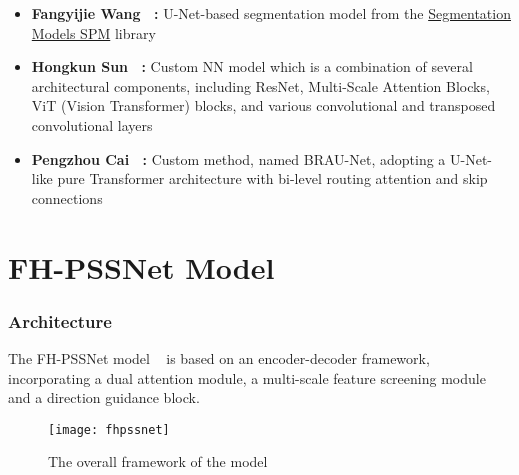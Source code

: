 \begin{frame}
\begin{itemize}
            \item \textbf{Fangyijie Wang ~\cite{FangyijieWang}:}
            U-Net-based segmentation model from the 
            \href{https://pypi.org/project/segmentation-models-pytorch/}{Segmentation Models SPM} 
            library

            \item \textbf{Hongkun Sun ~\cite{hongkunsun}:}
            Custom NN model which is a combination of several 
            architectural components, including ResNet, 
            Multi-Scale Attention Blocks, ViT (Vision Transformer) blocks, 
            and various convolutional and transposed convolutional layers

            \item \textbf{Pengzhou Cai ~\cite{cai2023pubic}:}
            Custom method, named BRAU-Net, adopting a U-Net-like
            pure Transformer architecture with bi-level routing 
            attention and skip connections
            \end{itemize}
\end{frame}


\section{FH-PSSNet Model}
\begin{frame}
    \frametitle{Architecture}
    The FH-PSSNet model ~\cite{organizers} is based on an encoder-decoder
    framework, incorporating a dual attention module, a multi-scale feature screening module and a
    direction guidance block. 
    \vspace{-3mm}
    \begin{figure}[H]
        \texttt{[image: fhpssnet]}
        \vspace{-2mm}
        \caption{The overall framework of the model}
    \end{figure}

\end{frame}

